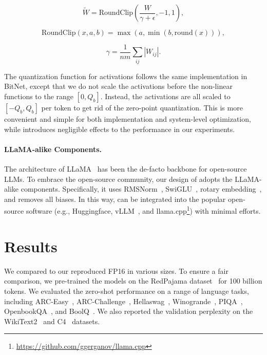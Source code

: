 \begin{equation}
    \widetilde{W} = \mathrm{RoundClip}(\frac{W}{\gamma + \epsilon}, -1, 1),
\end{equation}

\begin{equation}
    \mathrm{RoundClip}(x, a, b) = \max(a, \min(b, \mathrm{round}(x))),
\end{equation}

\begin{equation}
    \gamma = \frac{1}{nm}\sum_{ij} |W_{ij}|.
\end{equation}

The quantization function for activations follows the same implementation in BitNet, except that we do not scale the activations before the non-linear functions to the range $[0, Q_b]$. Instead, the activations are all scaled to $[-Q_b, Q_b]$ per token to get rid of the zero-point quantization. This is more convenient and simple for both implementation and system-level optimization, while introduces negligible effects to the performance in our experiments.

\paragraph{LLaMA-alike Components.}

The architecture of LLaMA~\cite{llama, llama2} has been the de-facto backbone for open-source LLMs. To embrace the open-source community, our design of  adopts the LLaMA-alike components. Specifically, it uses RMSNorm~\cite{rmsnorm}, SwiGLU~\cite{swiglu}, rotary embedding~\cite{rope}, and removes all biases. In this way,  can be integrated into the popular open-source software (e.g., Huggingface, vLLM~\cite{vllm}, and llama.cpp\footnote{\url{https://github.com/ggerganov/llama.cpp}}) with minimal efforts.

\section{Results}

We compared  to our reproduced FP16  in various sizes. To ensure a fair comparison, we pre-trained the models on the RedPajama dataset~\cite{redpajama} for 100 billion tokens. We evaluated the zero-shot performance on a range of language tasks, including ARC-Easy~\cite{arc}, ARC-Challenge~\cite{arc}, Hellaswag~\cite{hellaswag}, Winogrande~\cite{winoGrande}, PIQA~\cite{piqa}, OpenbookQA~\cite{openbookqa}, and BoolQ~\cite{boolq}. We also reported the validation perplexity on the WikiText2~\cite{wikitext2} and C4~\cite{c4} datasets.

